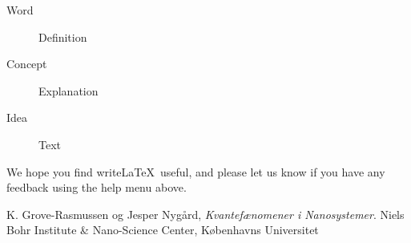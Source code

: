 \documentclass[a4paper]{article}
\begin{document}
\begin{description}
\item[Word] Definition
\item[Concept] Explanation
\item[Idea] Text
\end{description}

We hope you find write\LaTeX\ useful, and please let us know if you have any feedback using the help menu above.

\begin{thebibliography}{9}
  K. Grove-Rasmussen og Jesper Nygård,
  \emph{Kvantefænomener i Nanosystemer}.
  Niels Bohr Institute \& Nano-Science Center, Københavns Universitet

\end{thebibliography}
\end{document}
